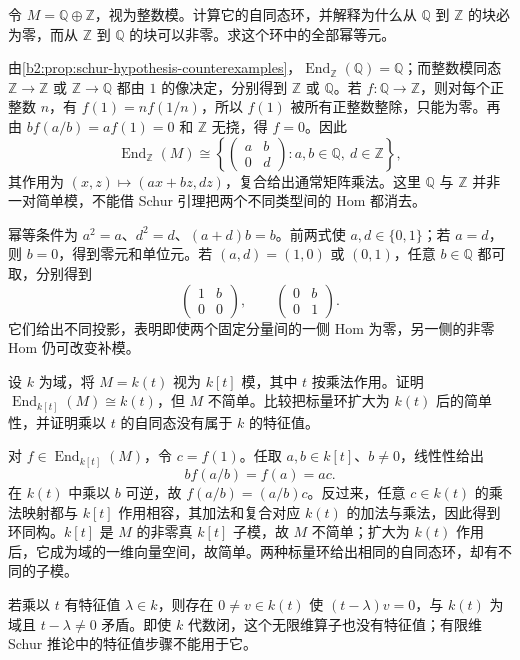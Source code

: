 \begin{exercise}\label{b2:ex:13-schur-converse}
	令 \(M=\mathbb Q\oplus\mathbb Z\)，视为整数模。计算它的自同态环，并解释为什么从 \(\mathbb Q\) 到 \(\mathbb Z\) 的块必为零，而从 \(\mathbb Z\) 到 \(\mathbb Q\) 的块可以非零。求这个环中的全部幂等元。
\end{exercise}
\begin{solution}
	由\cref{b2:prop:schur-hypothesis-counterexamples}，\(\operatorname{End}_{\mathbb Z}(\mathbb Q)=\mathbb Q\)；而整数模同态 \(\mathbb Z\to\mathbb Z\) 或 \(\mathbb Z\to\mathbb Q\) 都由 \(1\) 的像决定，分别得到 \(\mathbb Z\) 或 \(\mathbb Q\)。若 \(f:\mathbb Q\to\mathbb Z\)，则对每个正整数 \(n\)，有 \(f(1)=n f(1/n)\)，所以 \(f(1)\) 被所有正整数整除，只能为零。再由 \(b f(a/b)=a f(1)=0\) 和 \(\mathbb Z\) 无挠，得 \(f=0\)。因此
	\[
		\operatorname{End}_{\mathbb Z}(M)\cong
		\left\{\begin{pmatrix}a&b\\0&d\end{pmatrix}:a,b\in\mathbb Q,\ d\in\mathbb Z\right\},
	\]
	其作用为 \((x,z)\mapsto(ax+bz,dz)\)，复合给出通常矩阵乘法。这里 \(\mathbb Q\) 与 \(\mathbb Z\) 并非一对简单模，不能借 Schur 引理把两个不同类型间的 Hom 都消去。

	幂等条件为 \(a^2=a\)、\(d^2=d\)、\((a+d)b=b\)。前两式使 \(a,d\in\{0,1\}\)；若 \(a=d\)，则 \(b=0\)，得到零元和单位元。若 \((a,d)=(1,0)\) 或 \((0,1)\)，任意 \(b\in\mathbb Q\) 都可取，分别得到
	\[
		\begin{pmatrix}1&b\\0&0\end{pmatrix},\qquad
		\begin{pmatrix}0&b\\0&1\end{pmatrix}.
	\]
	它们给出不同投影，表明即使两个固定分量间的一侧 Hom 为零，另一侧的非零 Hom 仍可改变补模。
\end{solution}

\begin{exercise}\label{b2:ex:13-schur-finite-dimension}
	设 \(k\) 为域，将 \(M=k(t)\) 视为 \(k[t]\) 模，其中 \(t\) 按乘法作用。证明 \(\operatorname{End}_{k[t]}(M)\cong k(t)\)，但 \(M\) 不简单。比较把标量环扩大为 \(k(t)\) 后的简单性，并证明乘以 \(t\) 的自同态没有属于 \(k\) 的特征值。
\end{exercise}
\begin{solution}
	对 \(f\in\operatorname{End}_{k[t]}(M)\)，令 \(c=f(1)\)。任取 \(a,b\in k[t]\)、\(b\ne0\)，线性性给出
	\[
		b f(a/b)=f(a)=ac.
	\]
	在 \(k(t)\) 中乘以 \(b\) 可逆，故 \(f(a/b)=(a/b)c\)。反过来，任意 \(c\in k(t)\) 的乘法映射都与 \(k[t]\) 作用相容，其加法和复合对应 \(k(t)\) 的加法与乘法，因此得到环同构。\(k[t]\) 是 \(M\) 的非零真 \(k[t]\) 子模，故 \(M\) 不简单；扩大为 \(k(t)\) 作用后，它成为域的一维向量空间，故简单。两种标量环给出相同的自同态环，却有不同的子模。

	若乘以 \(t\) 有特征值 \(\lambda\in k\)，则存在 \(0\ne v\in k(t)\) 使 \((t-\lambda)v=0\)，与 \(k(t)\) 为域且 \(t-\lambda\ne0\) 矛盾。即使 \(k\) 代数闭，这个无限维算子也没有特征值；有限维 Schur 推论中的特征值步骤不能用于它。
\end{solution}

